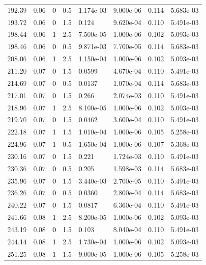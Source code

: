 \documentclass[preview]{standalone}
\begin{document}
{{{\begin{tabular}{L{1.2cm}C{1.2cm} C{0.3cm}C{0.5cm} C{1.4cm}C{1.4cm} C{1.4cm}C{1.4cm}}
  192.39  &  0.06  & 0     & 0.5 &  1.174e-03  & 9.000e-06  & 0.114 &  5.683e-03   \\ 
  193.72  &  0.06  & 0     & 1.5 &  0.124  & 9.620e-04  & 0.110 &  5.491e-03   \\ 
  198.44  &  0.06  & 1     & 2.5 &  7.500e-05  & 1.000e-06  & 0.102 &  5.093e-03   \\ 
  198.46  &  0.06  & 0     & 0.5 &  9.871e-03  & 7.700e-05  & 0.114 &  5.683e-03   \\ 
  208.06  &  0.06  & 1     & 2.5 &  1.150e-04  & 1.000e-06  & 0.102 &  5.093e-03   \\ 
  211.20  &  0.07  & 0     & 1.5 &  0.0599  & 4.670e-04  & 0.110 &  5.491e-03   \\ 
  214.69  &  0.07  & 0     & 0.5 &  0.0137  & 1.070e-04  & 0.114 &  5.683e-03   \\ 
  217.01  &  0.07  & 0     & 1.5 &  0.266  & 2.074e-03  & 0.110 &  5.491e-03   \\ 
  218.96  &  0.07  & 1     & 2.5 &  8.100e-05  & 1.000e-06  & 0.102 &  5.093e-03   \\ 
  219.70  &  0.07  & 0     & 1.5 &  0.0462  & 3.600e-04  & 0.110 &  5.491e-03   \\ 
  222.18  &  0.07  & 1     & 1.5 &  1.010e-04  & 1.000e-06  & 0.105 &  5.258e-03   \\ 
  224.96  &  0.07  & 1     & 0.5 &  1.650e-04  & 1.000e-06  & 0.107 &  5.368e-03   \\ 
  230.16  &  0.07  & 0     & 1.5 &  0.221  & 1.724e-03  & 0.110 &  5.491e-03   \\ 
  230.36  &  0.07  & 0     & 0.5 &  0.205  & 1.598e-03  & 0.114 &  5.683e-03   \\ 
  235.96  &  0.07  & 0     & 1.5 &  3.440e-03  & 2.700e-05  & 0.110 &  5.491e-03   \\ 
  236.26  &  0.07  & 0     & 0.5 &  0.0360  & 2.800e-04  & 0.114 &  5.683e-03   \\ 
  240.22  &  0.07  & 0     & 1.5 &  0.0817  & 6.360e-04  & 0.110 &  5.491e-03   \\ 
  241.66  &  0.08  & 1     & 2.5 &  8.200e-05  & 1.000e-06  & 0.102 &  5.093e-03   \\ 
  243.19  &  0.08  & 0     & 1.5 &  0.103  & 8.040e-04  & 0.110 &  5.491e-03   \\ 
  244.14  &  0.08  & 1     & 2.5 &  1.730e-04  & 1.000e-06  & 0.102 &  5.093e-03   \\ 
  251.25  &  0.08  & 1     & 1.5 &  9.000e-05  & 1.000e-06  & 0.105 &  5.258e-03   \\ 

\end{tabular}}}}
\end{document}
